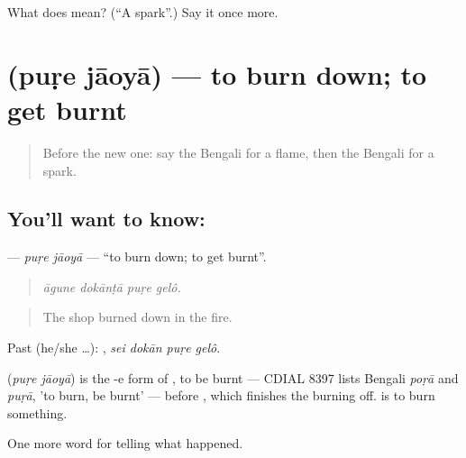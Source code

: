 \begin{tcolorbox}[breakable,colback=teal!4,colframe=teal!35!black,title={Before you move on}]
What does  mean? (\textquotedblleft{}A spark\textquotedblright{}.) Say it once more.
\end{tcolorbox}
\section[\texorpdfstring{\bn{পুড়ে} \bn{যাওয়া} (puṛe jāoyā)}{পুড়ে যাওয়া (puṛe jāoyā)}]{  (puṛe jāoyā) — to burn down; to get burnt}

\label{lesson:BN-C279-pure-jaoya}



\begin{quote}
Before the new one: say the Bengali for a flame, then the Bengali for a spark.
\end{quote}

\subsection*{You'll want to know:  }
\textbf{ } — \emph{puṛe jāoyā} — \textquotedblleft{}to burn down; to get burnt\textquotedblright{}.

\begin{quote}
   
\end{quote}

\begin{quote}
\emph{āgune dokānṭā puṛe gelô.}
\end{quote}

\begin{quote}
The shop burned down in the fire.
\end{quote}

Past (he/she …):    , \emph{sei dokān puṛe gelô}.

\begin{cousinweb}
\textbf{ } (\emph{puṛe jāoyā}) is the -e form of , to be burnt — CDIAL 8397 lists Bengali \emph{poṛā} and \emph{puṛā}, 'to burn, be burnt' — before \textbf{}, which finishes the burning off. \textbf{} is to burn something.
\end{cousinweb}

\begin{grammarlens}[title={What you've built}]
One more word for telling what happened.
\end{grammarlens}

